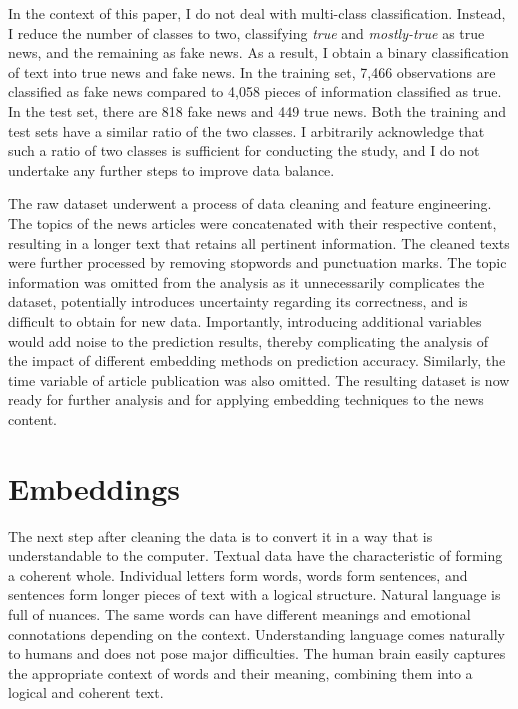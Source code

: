 In the context of this paper, I do not deal with multi-class classification. Instead, I reduce the number of classes to two, classifying \textit{true} and \textit{mostly-true} as true news, and the remaining as fake news. As a result, I obtain a binary classification of text into true news and fake news. In the training set, 7,466 observations are classified as fake news compared to 4,058 pieces of information classified as true. In the test set, there are 818 fake news and 449 true news.  Both the training and test sets have a similar ratio of the two classes. I arbitrarily acknowledge that such a ratio of two classes is sufficient for conducting the study, and I do not undertake any further steps to improve data balance.

The raw dataset underwent %
a process of data cleaning and feature engineering. The topics of the news articles were concatenated with their respective content, resulting in a longer text that retains all pertinent information. The cleaned texts were further processed by removing stopwords and punctuation marks. The topic information was omitted from the analysis as it unnecessarily complicates the dataset, potentially introduces uncertainty regarding its correctness, and is difficult to obtain for new data. Importantly, introducing additional variables would add noise to the prediction results, thereby complicating the analysis of the impact of different embedding methods on prediction accuracy. Similarly, the time variable of article publication was also omitted. The resulting dataset is now ready for further analysis and for applying embedding techniques to the news content. %

\section{Embeddings}

The next step after cleaning the data is to convert it in a way that is understandable to the computer. Textual data have the characteristic of forming a coherent whole. Individual letters form words, words form sentences, and sentences form longer pieces of text with a logical structure. Natural language is full of nuances. The same words can have different meanings and emotional connotations depending on the context. Understanding language comes naturally to humans and does not pose major difficulties. The human brain easily captures the appropriate context of words and their meaning, combining them into a logical and coherent text.

